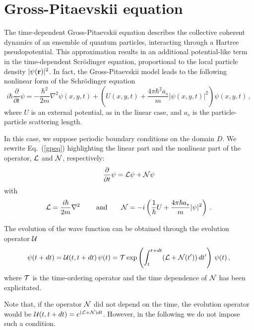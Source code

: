 \documentclass[a4paper,11pt]{article}
\begin{document}
\section{Gross-Pitaevskii equation}

The time-dependent Gross-Pitaevskii equation describes the collective coherent dynamics of
an ensemble of quantum particles, interacting through a Hartree pseudopotential.
This approximation results in an additional potential-like term in the time-dependent
Scr\"{o}dinger equation, proportional to the local particle density $|\psi({\bf r})|^2$.
In fact, the Gross-Pitaevskii model leads to the following nonlinear form of the
Schr\"odinger equation~\cite{leggettRMP01}
\begin{equation} \label{gpeq}
i \hbar \frac{\partial}{\partial t} \psi =
   -\frac{\hbar^2}{2m} \nabla^2 \psi(x,y,t) +
   \left(U(x,y,t) + \frac{4 \pi \hbar^2 a_s}{m} |\psi(x,y,t)|^2 \right) \psi(x,y,t) \, ,
\end{equation}
where $U$ is an external potential, as in the linear case, and $a_s$ is the
particle-particle scattering length. 

In this case, we suppose periodic boundary conditions on the domain $D$.
We rewrite Eq.~(\ref{gpeq}) highlighting the linear part and the nonlinear part of the operator,
$\cal L$ and $\cal N$, respectively:
\begin{equation}
\frac{\partial}{\partial t} \psi = {\cal L} \psi + {\cal N} \psi \label{eq:splitop}
\end{equation}
with
\begin{equation} \label{LandN}
{\cal L} = \frac{i\hbar}{2m} \nabla^2 \ \qquad \mbox{and} \qquad
{\cal N} = -i \left(\frac{1}{\hbar}U + \frac{4 \pi \hbar a_s}{m} |\psi|^2 \right) \, .
\end{equation}

The evolution of the wave function can be obtained through the evolution
operator ${\cal U}$
\begin{equation} \label{ssUoperator}
\psi(t+dt) = {\cal U}(t,t+dt) \, \psi(t) = {\cal T}\exp\left( \int_t^{t+dt}
({\cal L} + {\cal N}(t')) \, dt' \right) \, \psi(t) \, ,
\end{equation}
where ${\cal T}$ is the time-ordering operator and the time dependence of ${\cal N}$
has been explicitated.

Note that, if the operator ${\cal N}$ did not depend on the time, the
evolution operator would be ${\cal U}(t,t+dt) = e^{\left({\cal L} + {\cal N} \right) dt}$.
However, in the following we do not impose such a condition.
\end{document}
